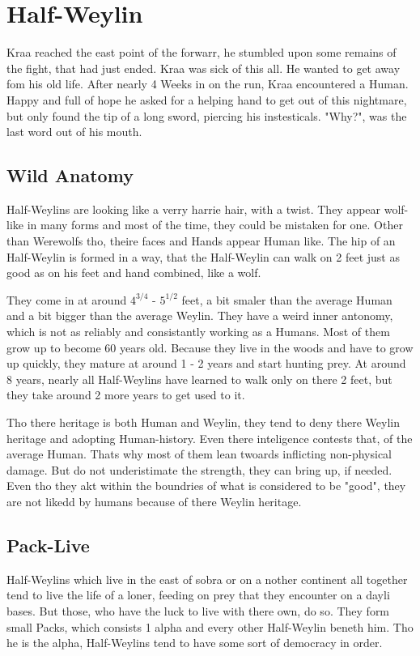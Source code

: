 \newpage
\section{Half-Weylin}

\begin{quotebox}
Kraa reached the east point of the forwarr, he stumbled upon some remains of the fight, that had just ended. Kraa was sick of this all. He wanted to get away fom his old life. After nearly 4 Weeks in on the run, Kraa encountered a Human. Happy and full of hope he asked for a helping hand to get out of this nightmare, but only found the tip of a long sword, piercing his instesticals. "Why?", was the last word out of his mouth.
\end{quotebox}

\subsection{Wild Anatomy}
Half-Weylins are looking like a verry harrie hair, with a twist. They appear wolf-like in many forms and most of the time, they could  be mistaken for one. Other than Werewolfs tho, theire faces and Hands appear Human like. The hip of an Half-Weylin is formed in a way, that the Half-Weylin can walk on 2 feet just as good as on his feet and hand combined, like a wolf.

They come in at around $4^{3/4}$ - $5^{1/2}$ feet, a bit smaler than the average Human and a bit bigger than the average Weylin. They have a weird inner antonomy, which is not as reliably and consistantly working as a Humans. Most of them grow up to become 60 years old. Because they live in the woods and have to grow up quickly, they mature at around 1 - 2 years and start hunting prey. At around 8 years, nearly all Half-Weylins have learned to walk only on there 2 feet, but they take around 2 more years to get used to it.

Tho there heritage is both Human and Weylin, they tend to deny there Weylin heritage and adopting Human-history. Even there inteligence contests that, of the average Human. Thats why most of them lean twoards inflicting non-physical damage. But do not underistimate the strength, they can bring up, if needed. Even tho they akt within the boundries of what is considered to be "good", they are not likedd by humans because of there Weylin heritage.

\subsection{Pack-Live}
Half-Weylins which live in the east of sobra or on a nother continent all together tend to live the life of a loner, feeding on prey that they encounter on a dayli bases. But those, who have the luck to live with there own, do so. They form small Packs, which consists 1 alpha and every other Half-Weylin beneth him. Tho he is the alpha, Half-Weylins tend to have some sort of democracy in order.

